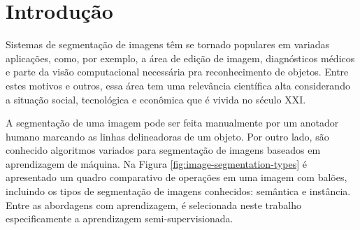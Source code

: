 \chapter{Introdução}\label{cap:introducao}

Sistemas de segmentação de imagens têm se tornado populares em
variadas aplicações, como, por exemplo, a área de edição de imagem,
diagnósticos médicos e parte da visão computacional necessária pra
reconhecimento de objetos. Entre estes motivos e outros, essa área tem
uma relevância científica alta considerando a situação social,
tecnológica e econômica que é vivida no século XXI.\@

A segmentação de uma imagem pode ser feita manualmente por um anotador
humano marcando as linhas delineadoras de um objeto. Por outro lado,
são conhecido algoritmos variados para segmentação de imagens baseados
em aprendizagem de máquina. Na Figura
\ref{fig:image-segmentation-types} é apresentado um quadro comparativo
de operações em uma imagem com balões, incluindo os tipos de
segmentação de imagens conhecidos: semântica e instância. Entre as
abordagens com aprendizagem, é selecionada neste trabalho
especificamente a aprendizagem semi-supervisionada.

\begin{figure}[h!]
        \captionsetup{width=16cm}
		\centering
\end{figure}


